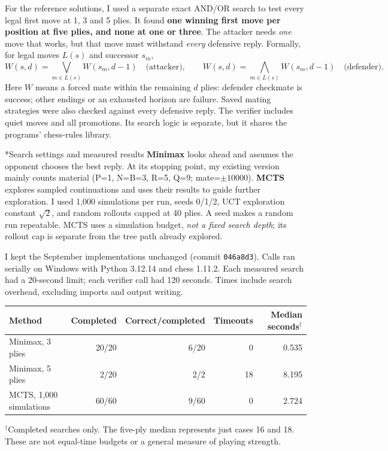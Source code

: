 \documentclass[10pt,letterpaper]{article}
\makeatletter
\renewcommand\section{\@startsection{section}{1}{0pt}{10pt}{5pt}{\normalfont\large\bfseries}}
\makeatother
\begin{document}
For the reference solutions, I used a separate exact AND/OR search to test every legal first move at 1, 3 and 5 plies. It found \textbf{one winning first move per position at five plies, and none at one or three}. The attacker needs \emph{one} move that works, but that move must withstand \emph{every} defensive reply. Formally, for legal moves $L(s)$ and successor $s_m$,
\[
W(s,d)=\bigvee_{m\in L(s)}W(s_m,d-1)\quad\text{(attacker)},\qquad
W(s,d)=\bigwedge_{m\in L(s)}W(s_m,d-1)\quad\text{(defender)}.
\]
Here $W$ means a forced mate within the remaining $d$ plies: defender checkmate is success; other endings or an exhausted horizon are failure. Saved mating strategies were also checked against every defensive reply. The verifier includes quiet moves and all promotions. Its search logic is separate, but it shares the programs' chess-rules library.

\section*{Search settings and measured results}
\textbf{Minimax} looks ahead and assumes the opponent chooses the best reply. At its stopping point, my existing version mainly counts material (P=1, N=B=3, R=5, Q=9; mate=$\pm10000$). \textbf{MCTS} explores sampled continuations and uses their results to guide further exploration. I used 1,000 simulations per run, seeds 0/1/2, UCT exploration constant $\sqrt2$, and random rollouts capped at 40 plies. A seed makes a random run repeatable. MCTS uses a simulation budget, \emph{not a fixed search depth}; its rollout cap is separate from the tree path already explored.

I kept the September implementations unchanged (commit \texttt{046a8d3}). Calls ran serially on Windows with Python 3.12.14 and chess 1.11.2. Each measured search had a 20-second limit; each verifier call had 120 seconds. Times include search overhead, excluding imports and output writing.
\begin{center}\small
\begin{tabular}{lrrrr}\toprule
Method & Completed & Correct/completed & Timeouts & Median seconds$^\dagger$\\\midrule
Minimax, 3 plies & 20/20 & 6/20 & 0 & 0.535 \\
Minimax, 5 plies & 2/20 & 2/2 & 18 & 8.195 \\
MCTS, 1,000 simulations & 60/60 & 9/60 & 0 & 2.724 \\
\bottomrule\end{tabular}
\end{center}
{\footnotesize $^\dagger$Completed searches only. The five-ply median represents just cases 16 and 18. These are not equal-time budgets or a general measure of playing strength.}
\end{document}
